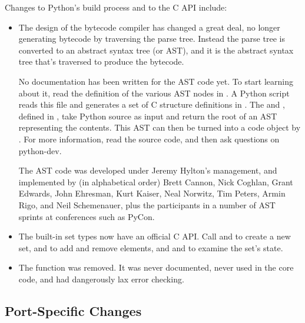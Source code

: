 \documentclass{howto}
\begin{document}
Changes to Python's build process and to the C API include:

\begin{itemize}

\item The design of the bytecode compiler has changed a great deal, no
longer generating bytecode by traversing the parse tree.  Instead
the parse tree is converted to an abstract syntax tree (or AST), and it is 
the abstract syntax tree that's traversed to produce the bytecode.

No documentation has been written for the AST code yet.  To start
learning about it, read the definition of the various AST nodes in
.  A Python script reads this file and
generates a set of C structure definitions in
.  The 
and , defined in
, take Python source as input and return the
root of an AST representing the contents.  This AST can then be turned
into a code object by .  For more
information, read the source code, and then ask questions on
python-dev.

The AST code was developed under Jeremy Hylton's management, and
implemented by (in alphabetical order) Brett Cannon, Nick Coghlan,
Grant Edwards, John Ehresman, Kurt Kaiser, Neal Norwitz, Tim Peters,
Armin Rigo, and Neil Schemenauer, plus the participants in a number of
AST sprints at conferences such as PyCon.
 
\item The built-in set types now have an official C API.  Call
 and  to create a
new set,  and  to
add and remove elements, and  and
 to examine the set's state.

\item The  function was removed.  It was
never documented, never used in the core code, and had dangerously lax
error checking.

\end{itemize}


\subsection{Port-Specific Changes}
\end{document}
